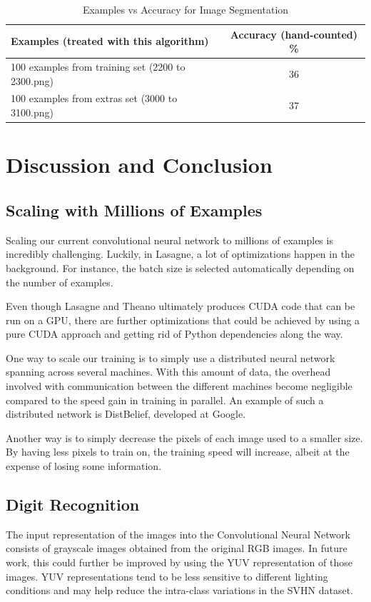 \documentclass{article} %
\begin{document}
\begin{center}
	\begin{table}[h]
  		\begin{tabular}{ | l || c ||}
	    	\hline
		    Examples (treated with this algorithm) & Accuracy (hand-counted) \% \\ \hline \hline
		    100 examples from training set (2200 to 2300.png) &  36 \\ \hline
		    100 examples from extras set (3000 to 3100.png) & 37 \\
		    \hline
        \end{tabular}
		  \caption{Examples vs Accuracy for Image Segmentation}
		  \label{table:segmentation}
  	\end{table}
\end{center}

\section{Discussion and Conclusion}
\subsection{Scaling with Millions of Examples}
Scaling our current convolutional neural network to millions of examples is incredibly challenging. Luckily, in Lasagne, a lot of optimizations happen in the background. For instance, the batch size is selected automatically depending on the number of examples.

Even though Lasagne and Theano ultimately produces CUDA code that can be run on a GPU, there are further optimizations that could be achieved by using a pure CUDA approach and getting rid of Python dependencies along the way. 

One way to scale our training is to simply use a distributed neural network spanning across several machines. With this amount of data, the overhead involved with communication between the different machines become negligible compared to the speed gain in training in parallel. An example of such a distributed network is DistBelief\cite{dean2012large}, developed at Google.

Another way is to simply decrease the pixels of each image used to a smaller size. By having less pixels to train on, the training speed will increase, albeit at the expense of losing some information.

\subsection{Digit Recognition}
The input representation of the images into the Convolutional Neural Network consists of grayscale images obtained from the original RGB images. In future work, this could further be improved by using the YUV representation of those images. YUV representations tend to be less sensitive to different lighting conditions and may help reduce the intra-class variations in the SVHN dataset.
\end{document}
